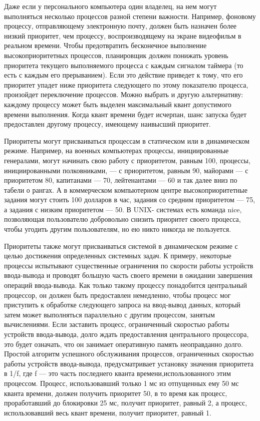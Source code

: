 Даже если у персонального компьютера один владелец, на нем могут выполняться несколько процессов разной степени важности. Например, фоновому процессу, отправляющему электронную почту, должен быть назначен более низкий приоритет, чем процессу, воспроизводящему на экране видеофильм в реальном времени. Чтобы предотвратить бесконечное выполнение высокоприоритетных процессов, планировщик должен понижать уровень приоритета текущего выполняемого процесса с каждым сигналом таймера (то есть с каждым его прерыванием). Если это действие приведет к тому, что его приоритет упадет ниже приоритета следующего по этому показателю процесса, произойдет переключение процессов. Можно выбрать и другую альтернативу: каждому процессу может быть выделен максимальный квант допустимого времени выполнения. Когда квант времени будет исчерпан, шанс запуска будет предоставлен другому процессу, имеющему наивысший приоритет.

Приоритеты могут присваиваться процессам в статическом или в динамическом режиме. Например, на военных компьютерах процессы, инициированные генералами, могут начинать свою работу с приоритетом, равным 100, процессы, инициированными полковниками, — с приоритетом, равным 90, майорами — с приоритетом 80, капитанами — 70, лейтенантами — 60 и так далее вниз по табели о рангах. А в коммерческом компьютерном центре высокоприоритетные задания могут стоить 100 долларов в час, задания со средним приоритетом — 75, а задания с низким приоритетом — 50. В UNIX-
системах есть команда nice, позволяющая пользователю добровольно снизить приоритет своего процесса, чтобы угодить другим пользователям, но ею никто никогда не пользуется.

Приоритеты также могут присваиваться системой в динамическом режиме с целью достижения определенных системных задач. К примеру, некоторые процессы испытывают существенные ограничения по скорости работы устройств ввода-вывода и проводят большую часть своего времени в ожидании завершения операций ввода-вывода. Как только такому процессу понадобится центральный процессор, он должен быть предоставлен немедленно, чтобы процесс мог приступить к обработке следующего запроса на ввод-вывод данных, который затем может выполняться параллельно с другим процессом, занятым вычислениями. Если заставить процесс, ограниченный скоростью работы устройств ввода-вывода, долго ждать предоставления центрального процессора, это будет означать, что он занимает оперативную память неоправданно долго. Простой алгоритм успешного обслуживания процессов, ограниченных скоростью работы устройств ввода-вывода, предусматривает установку значения приоритета в 1/f, где f — это часть последнего кванта времени,использованного этим процессом. Процесс, использовавший только 1 мс из отпущенных ему 50 мс кванта времени, должен получить приоритет 50, в то время как процесс, проработавший до блокировки 25 мс, получит приоритет, равный 2, а процесс, использовавший весь квант времени, получит приоритет, равный 1.

